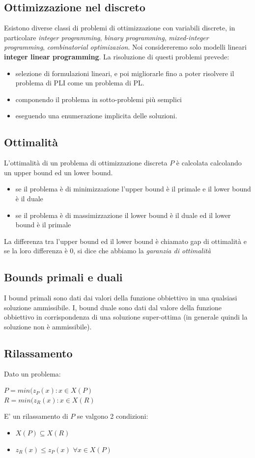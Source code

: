 \documentclass[11pt, oneside]{article}   	%
\begin{document}
\subsection{Ottimizzazione nel discreto}
Esistono diverse classi di problemi di ottimizzazione con variabili discrete, in particolare \emph{integer programming}, \emph{binary programming}, \emph{mixed-integer programming}, \emph{combinatorial optimizazion}. Noi considereremo solo modelli lineari \textbf{integer linear programming}.
La risoluzione di questi problemi prevede:
\begin{itemize}
\item selezione di formulazioni lineari, e poi migliorarle fino a poter risolvere il problema di PLI come un problema di PL.
\item componendo il problema in sotto-problemi più semplici
\item eseguendo una enumerazione implicita delle soluzioni.
\end{itemize}
\subsection{Ottimalità}
L'ottimalità di un problema di ottimizzazione discreta $P$ è calcolata calcolando un upper bound ed un lower bound. \begin{itemize}
\item se il problema è di minimizzazione l'upper bound è il primale e il lower bound è il duale
\item se il problema è di massimizzazione il lower bound è il duale ed il lower bound è il primale
\end{itemize}
La differenza tra l'upper bound ed il lower bound è chiamato gap di ottimalità e se la loro differenza è $0$, si dice che abbiamo la \emph{garanzia di ottimalità}

\subsection{Bounds primali e duali}
I bound primali sono dati dai valori della funzione obbiettivo in una qualsiasi soluzione ammissibile. I, bound duale sono dati dal valore della funzione obbiettivo in corrispondenza di una soluzione super-ottima (in generale quindi la soluzione non è ammissibile).
\subsection{Rilassamento}
Dato un problema:
\begin{center}
	$P = min(z_P(x) : x \in X(P)$\\
	$R = min(z_R(x) : x \in X(R)$
\end{center} 
E' un rilassamento di $P$ se valgono 2 condizioni:
\begin{itemize}
\item $X(P) \subseteq X(R)$
\item $z_R(x) \leq z_P(x)$ $\forall  x \in X(P)$
\end{itemize}
\end{document}
